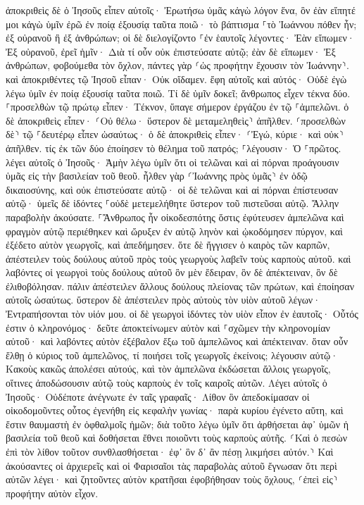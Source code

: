 \documentclass[twoside, 9pt]{extreport}
\begin{document}
ἀποκριθεὶς δὲ ὁ Ἰησοῦς εἶπεν αὐτοῖς· Ἐρωτήσω ὑμᾶς κἀγὼ λόγον ἕνα, ὃν ἐὰν εἴπητέ μοι κἀγὼ ὑμῖν ἐρῶ ἐν ποίᾳ ἐξουσίᾳ ταῦτα ποιῶ· 
τὸ βάπτισμα ⸀τὸ Ἰωάννου πόθεν ἦν; ἐξ οὐρανοῦ ἢ ἐξ ἀνθρώπων; οἱ δὲ διελογίζοντο ⸀ἐν ἑαυτοῖς λέγοντες· Ἐὰν εἴπωμεν· Ἐξ οὐρανοῦ, ἐρεῖ ἡμῖν· Διὰ τί οὖν οὐκ ἐπιστεύσατε αὐτῷ; 
ἐὰν δὲ εἴπωμεν· Ἐξ ἀνθρώπων, φοβούμεθα τὸν ὄχλον, πάντες γὰρ ⸂ὡς προφήτην ἔχουσιν τὸν Ἰωάννην⸃. 
καὶ ἀποκριθέντες τῷ Ἰησοῦ εἶπαν· Οὐκ οἴδαμεν. ἔφη αὐτοῖς καὶ αὐτός· Οὐδὲ ἐγὼ λέγω ὑμῖν ἐν ποίᾳ ἐξουσίᾳ ταῦτα ποιῶ. 
Τί δὲ ὑμῖν δοκεῖ; ἄνθρωπος εἶχεν τέκνα δύο. ⸀προσελθὼν τῷ πρώτῳ εἶπεν· Τέκνον, ὕπαγε σήμερον ἐργάζου ἐν τῷ ⸀ἀμπελῶνι. 
ὁ δὲ ἀποκριθεὶς εἶπεν· ⸂Οὐ θέλω· ὕστερον δὲ μεταμεληθεὶς⸃ ἀπῆλθεν. 
⸂προσελθὼν δὲ⸃ τῷ ⸀δευτέρῳ εἶπεν ὡσαύτως· ὁ δὲ ἀποκριθεὶς εἶπεν· ⸂Ἐγώ, κύριε· καὶ οὐκ⸃ ἀπῆλθεν. 
τίς ἐκ τῶν δύο ἐποίησεν τὸ θέλημα τοῦ πατρός; ⸀λέγουσιν· Ὁ ⸀πρῶτος. λέγει αὐτοῖς ὁ Ἰησοῦς· Ἀμὴν λέγω ὑμῖν ὅτι οἱ τελῶναι καὶ αἱ πόρναι προάγουσιν ὑμᾶς εἰς τὴν βασιλείαν τοῦ θεοῦ. 
ἦλθεν γὰρ ⸂Ἰωάννης πρὸς ὑμᾶς⸃ ἐν ὁδῷ δικαιοσύνης, καὶ οὐκ ἐπιστεύσατε αὐτῷ· οἱ δὲ τελῶναι καὶ αἱ πόρναι ἐπίστευσαν αὐτῷ· ὑμεῖς δὲ ἰδόντες ⸀οὐδὲ μετεμελήθητε ὕστερον τοῦ πιστεῦσαι αὐτῷ. 
Ἄλλην παραβολὴν ἀκούσατε. ⸀Ἄνθρωπος ἦν οἰκοδεσπότης ὅστις ἐφύτευσεν ἀμπελῶνα καὶ φραγμὸν αὐτῷ περιέθηκεν καὶ ὤρυξεν ἐν αὐτῷ ληνὸν καὶ ᾠκοδόμησεν πύργον, καὶ ἐξέδετο αὐτὸν γεωργοῖς, καὶ ἀπεδήμησεν. 
ὅτε δὲ ἤγγισεν ὁ καιρὸς τῶν καρπῶν, ἀπέστειλεν τοὺς δούλους αὐτοῦ πρὸς τοὺς γεωργοὺς λαβεῖν τοὺς καρποὺς αὐτοῦ. 
καὶ λαβόντες οἱ γεωργοὶ τοὺς δούλους αὐτοῦ ὃν μὲν ἔδειραν, ὃν δὲ ἀπέκτειναν, ὃν δὲ ἐλιθοβόλησαν. 
πάλιν ἀπέστειλεν ἄλλους δούλους πλείονας τῶν πρώτων, καὶ ἐποίησαν αὐτοῖς ὡσαύτως. 
ὕστερον δὲ ἀπέστειλεν πρὸς αὐτοὺς τὸν υἱὸν αὐτοῦ λέγων· Ἐντραπήσονται τὸν υἱόν μου. 
οἱ δὲ γεωργοὶ ἰδόντες τὸν υἱὸν εἶπον ἐν ἑαυτοῖς· Οὗτός ἐστιν ὁ κληρονόμος· δεῦτε ἀποκτείνωμεν αὐτὸν καὶ ⸀σχῶμεν τὴν κληρονομίαν αὐτοῦ· 
καὶ λαβόντες αὐτὸν ἐξέβαλον ἔξω τοῦ ἀμπελῶνος καὶ ἀπέκτειναν. 
ὅταν οὖν ἔλθῃ ὁ κύριος τοῦ ἀμπελῶνος, τί ποιήσει τοῖς γεωργοῖς ἐκείνοις; 
λέγουσιν αὐτῷ· Κακοὺς κακῶς ἀπολέσει αὐτούς, καὶ τὸν ἀμπελῶνα ἐκδώσεται ἄλλοις γεωργοῖς, οἵτινες ἀποδώσουσιν αὐτῷ τοὺς καρποὺς ἐν τοῖς καιροῖς αὐτῶν. 
Λέγει αὐτοῖς ὁ Ἰησοῦς· Οὐδέποτε ἀνέγνωτε ἐν ταῖς γραφαῖς· Λίθον ὃν ἀπεδοκίμασαν οἱ οἰκοδομοῦντες οὗτος ἐγενήθη εἰς κεφαλὴν γωνίας· παρὰ κυρίου ἐγένετο αὕτη, καὶ ἔστιν θαυμαστὴ ἐν ὀφθαλμοῖς ἡμῶν; 
διὰ τοῦτο λέγω ὑμῖν ὅτι ἀρθήσεται ἀφ᾽ ὑμῶν ἡ βασιλεία τοῦ θεοῦ καὶ δοθήσεται ἔθνει ποιοῦντι τοὺς καρποὺς αὐτῆς. 
⸂Καὶ ὁ πεσὼν ἐπὶ τὸν λίθον τοῦτον συνθλασθήσεται· ἐφ᾽ ὃν δ᾽ ἂν πέσῃ λικμήσει αὐτόν.⸃ 
Καὶ ἀκούσαντες οἱ ἀρχιερεῖς καὶ οἱ Φαρισαῖοι τὰς παραβολὰς αὐτοῦ ἔγνωσαν ὅτι περὶ αὐτῶν λέγει· 
καὶ ζητοῦντες αὐτὸν κρατῆσαι ἐφοβήθησαν τοὺς ὄχλους, ⸂ἐπεὶ εἰς⸃ προφήτην αὐτὸν εἶχον. 
\end{document}
